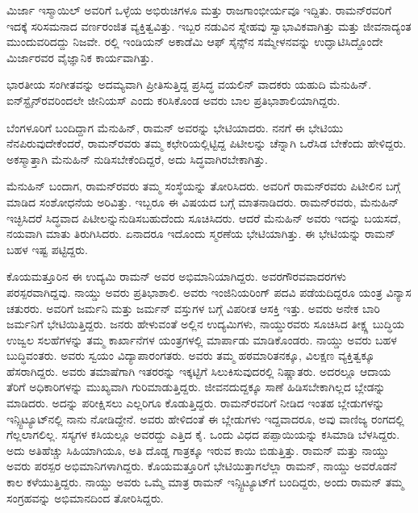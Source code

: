 ಮಿರ್ಜಾ ಇಸ್ಮಾಯಿಲ್ ಅವರಿಗೆ ಒಳ್ಳೆಯ ಅಭಿರುಚಿಗಳೂ ಮತ್ತು ರಾಜಗಾಂಭೀರ್ಯವೂ ಇದ್ದಿತು. ರಾಮನ್‍ರವರಿಗೆ ಇದಕ್ಕೆ ಸರಿಸಮನಾದ ವರ್ಣರಂಜಿತ ವ್ಯಕ್ತಿತ್ವವಿತ್ತು. ಇಬ್ಬರ ನಡುವಿನ ಸ್ನೇಹವು ಸ್ವಾಭಾವಿಕವಾಗಿತ್ತು ಮತ್ತು ಜೀವನಾದ್ಯಂತ ಮುಂದುವರಿದದ್ದು ನಿಜವೇ. ರಲ್ಲಿ ಇಂಡಿಯನ್ ಅಕಾಡೆಮಿ ಆಫ್ ಸೈನ್ಸ್‌ನ ಸಮ್ಮೇಳನವನ್ನು ಉದ್ಘಾಟಿಸಿದ್ದೊಂದೇ ಮಿರ್ಜಾರವರ ವೈಜ್ಞಾನಿಕ ಕಾರ್ಯವಾಗಿತ್ತು.



ಭಾರತೀಯ ಸಂಗೀತವನ್ನು ಅದಮ್ಯವಾಗಿ ಪ್ರೀತಿಸುತ್ತಿದ್ದ ಪ್ರಸಿದ್ಧ ವಯಲಿನ್ ವಾದಕರು ಯಹುದಿ ಮೆನುಹಿನ್. ಐನ್‍ಸ್ಟೈನ್‍ರವರಿಂದಲೇ ಜೀನಿಯಸ್ ಎಂದು ಕರಿಸಿಕೊಂಡ ಅವರು ಬಾಲ ಪ್ರತಿಭಾಶಾಲಿಯಾಗಿದ್ದರು.

ಬೆಂಗಳೂರಿಗೆ ಬಂದಿದ್ದಾಗ ಮೆನುಹಿನ್, ರಾಮನ್ ಅವರನ್ನು ಭೇಟಿಯಾದರು. ನನಗೆ ಈ ಭೇಟಿಯು ನೆನಪಿರುವುದೇಕೆಂದರೆ, ರಾಮನ್‍ರವರು ತಮ್ಮ ಕಛೇರಿಯಲ್ಲಿಟ್ಟಿದ್ದ ಪಿಟೀಲನ್ನು ಚೆನ್ನಾಗಿ ಒರೆಸಿಡ ಬೇಕೆಂದು ಹೇಳಿದ್ದರು. ಅಕಸ್ಮಾತ್ತಾಗಿ ಮೆನುಹಿನ್ ನುಡಿಸಬೇಕೆಂದಿದ್ದರೆ, ಅದು ಸಿದ್ಧವಾಗಿರಬೇಕಾಗಿತ್ತು.

ಮೆನುಹಿನ್ ಬಂದಾಗ, ರಾಮನ್‍ರವರು ತಮ್ಮ ಸಂಸ್ಥೆಯನ್ನು ತೋರಿಸಿದರು. ಅವರಿಗೆ ರಾಮನ್‍ರವರು ಪಿಟೀಲಿನ ಬಗ್ಗೆ ಮಾಡಿದ ಸಂಶೋಧನೆಯ ಅರಿವಿತ್ತು. ಇಬ್ಬರೂ ಈ ವಿಷಯದ ಬಗ್ಗೆ ಮಾತನಾಡಿದರು. ರಾಮನ್‍ರವರು, ಮೆನುಹಿನ್ ಇಚ್ಛಿಸಿದರೆ ಸಿದ್ಧವಾದ ಪಿಟೀಲನ್ನು\break ನುಡಿಸಬಹುದೆಂದು ಸೂಚಿಸಿದರು. ಆದರೆ ಮೆನುಹಿನ್ ಅವರು ಇದನ್ನು ಬಯಸದೆ, ನಯವಾಗಿ ಮಾತು ತಿರುಗಿಸಿದರು. ಏನಾದರೂ ಇದೊಂದು ಸ್ಮರಣೆಯ ಭೇಟಿಯಾಗಿತ್ತು. ಈ ಭೇಟಿಯನ್ನು ರಾಮನ್ ಬಹಳ ಇಷ್ಟ ಪಟ್ಟಿದ್ದರು.



ಕೊಯಮತ್ತೂರಿನ ಈ ಉದ್ಯಮಿ ರಾಮನ್ ಅವರ ಅಭಿಮಾನಿಯಾಗಿದ್ದರು. ಅವರ\break ಗೌರವವಾದರಗಳು ಪರಸ್ಪರವಾಗಿದ್ದವು. ನಾಯ್ಡು ಅವರು ಪ್ರತಿಭಾಶಾಲಿ. ಅವರು ಇಂಜಿನಿಯರಿಂಗ್ ಪದವಿ ಪಡೆಯದಿದ್ದರೂ ಯಂತ್ರ ವಿನ್ಯಾಸ ಚತುರರು. ಅವರಿಗೆ ಜರ್ಮನಿ ಮತ್ತು ಜರ್ಮನ್ ವಸ್ತುಗಳ ಬಗ್ಗೆ ವಿಪರೀತ ಆಸಕ್ತಿ ಇತ್ತು. ಅವರು ಅನೇಕ ಬಾರಿ ಜರ್ಮನಿಗೆ ಭೇಟಿಯಿತ್ತಿದ್ದರು. ಜನರು ಹೇಳುವಂತೆ ಅಲ್ಲಿನ ಉದ್ಯಮಿಗಳು, ನಾಯ್ಡುರವರು ಸೂಚಿಸಿದ ತೀಕ್ಷ್ಣ ಬುದ್ಧಿಯ ಉಜ್ವಲ ಸಲಹೆಗಳನ್ನು ತಮ್ಮ ಕಾರ್ಖಾನೆಗಳ ಯಂತ್ರಗಳಲ್ಲಿ ಮಾರ್ಪಾಡು ಮಾಡಿಕೊಂಡರು. ನಾಯ್ಡು ಅವರು ಬಹಳ ಬುದ್ಧಿವಂತರು. ಅವರು ಸ್ವಯಂ ವಿದ್ಯಾಪಾರಂಗತರು. ಅವರು ತಮ್ಮ ಹಠಮಾರಿತನಕ್ಕೂ, ವಿಲಕ್ಷಣ ವ್ಯಕ್ತಿತ್ವಕ್ಕೂ ಹೆಸರಾಗಿದ್ದರು. ಅವರು ತಮಾಷೆಗಾಗಿ ಇತರರನ್ನು ಇಕ್ಕಟ್ಟಿಗೆ ಸಿಲುಕಿಸುವುದರಲ್ಲಿ ನಿಷ್ಣಾತರು. ಅದರಲ್ಲೂ ಆದಾಯ ತೆರಿಗೆ ಅಧಿಕಾರಿಗಳನ್ನು ಮುಖ್ಯವಾಗಿ ಗುರಿಮಾಡುತ್ತಿದ್ದರು. ಜೀವನದುದ್ದಕ್ಕೂ ಸಾಣೆ ಹಿಡಿಸಬೇಕಾಗಿಲ್ಲದ ಬ್ಲೇಡನ್ನು ಮಾಡಿದರು. ಅದನ್ನು ಪರೀಕ್ಷಿಸಲು ಎಲ್ಲರಿಗೂ ಕೊಡುತ್ತಿದ್ದರು. ರಾಮನ್‍ರವರಿಗೆ ನೀಡಿದ ಇಂತಹ ಬ್ಲೇಡುಗಳನ್ನು ಇನ್ಸ್ಟಿಟ್ಯೂಟ್‍ನಲ್ಲಿ ನಾನು ನೋಡಿದ್ದೇನೆ. ಅವರು ಹೇಳಿದಂತೆ ಈ ಬ್ಲೇಡುಗಳು ಇದ್ದವಾದರೂ, ಅವು ವಾಣಿಜ್ಯ ರಂಗದಲ್ಲಿ ಗೆಲ್ಲಲಾಗಲಿಲ್ಲ. ಸಸ್ಯಗಳ ಕಸಿಯಲ್ಲೂ ಅವರದ್ದು ಎತ್ತಿದ ಕೈ. ಒಂದು ವಿಧದ ಪಪ್ಪಾಯಿಯನ್ನು ಕಸಿಮಾಡಿ ಬೆಳಸಿದ್ದರು. ಅದು ಅತಿಹೆಚ್ಚು ಸಿಹಿಯಾಗಿಯೂ, ಅತಿ ದೊಡ್ಡ ಗಾತ್ರಕ್ಕೂ ಇರುವ ಕಾಯಿ ಬಿಡುತ್ತಿತ್ತು. ರಾಮನ್ ಮತ್ತು ನಾಯ್ಡು ಅವರು ಪರಸ್ಪರ ಅಭಿಮಾನಿಗಳಾಗಿದ್ದರು. ಕೊಯಮತ್ತೂರಿಗೆ ಭೇಟಿಯಿತ್ತಾಗಲೆಲ್ಲಾ ರಾಮನ್, ನಾಯ್ಡು ಅವರೊಡನೆ ಕಾಲ ಕಳೆಯುತ್ತಿದ್ದರು. ನಾಯ್ಡು ಅವರು ಒಮ್ಮೆ ಮಾತ್ರ ರಾಮನ್ ಇನ್ಸ್ಟಿಟ್ಯೂಟ್‍ಗೆ ಬಂದಿದ್ದರು, ಅಂದು ರಾಮನ್ ತಮ್ಮ ಸಂಗ್ರಹವನ್ನು ಅಭಿಮಾನದಿಂದ ತೋರಿಸಿದ್ದರು.

